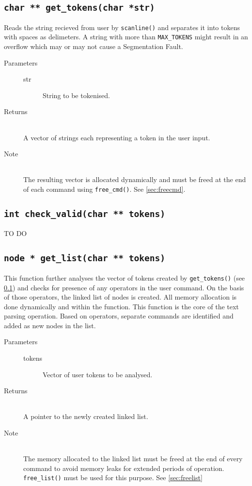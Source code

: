 \documentclass{article}
\begin{document}
\subsection{\lstinline{char ** get_tokens(char *str)}} \label{sec:gettokens}
Reads the string recieved from user by \lstinline{scanline()} and separates it into tokens with spaces as delimeters. A string with more than \lstinline{MAX_TOKENS} might result in an overflow which may or may not cause a Segmentation Fault.
\begin{description}
	\item[Parameters]\hfill
	\begin{description}
		\item[str] String to be tokenised.
	\end{description}
	\item[Returns]\hfill\\
		A vector of strings each representing a token in the user input.
	\item[Note]\hfill\\
		The resulting vector is allocated dynamically and must be freed at the end of each command using \lstinline{free_cmd()}. See \ref{sec:freecmd}.
\end{description}

\subsection{\lstinline{int check_valid(char ** tokens)}}
TO DO

\subsection{\lstinline{node * get_list(char ** tokens)}} \label{sec:getlist}
This function further analyses the vector of tokens created by \lstinline{get_tokens()} (see \ref{sec:gettokens}) and checks for presence of any operators in the user command. On the basis of those operators, the linked list of nodes is created. All memory allocation is done dynamically and within the function. This function is the core of the text parsing operation. Based on operators, separate commands are identified and added as new nodes in the list.
\begin{description}
	\item[Parameters]\hfill
	\begin{description}
		\item[tokens] Vector of user tokens to be analysed.
	\end{description}
	\item[Returns]\hfill\\
		A pointer to the newly created linked list.
	\item[Note]\hfill\\
		The memory allocated to the linked list must be freed at the end of every command to avoid memory leaks for extended periods of operation. \lstinline{free_list()} must be used for this purpose. See \ref{sec:freelist}
\end{description}
\end{document}
